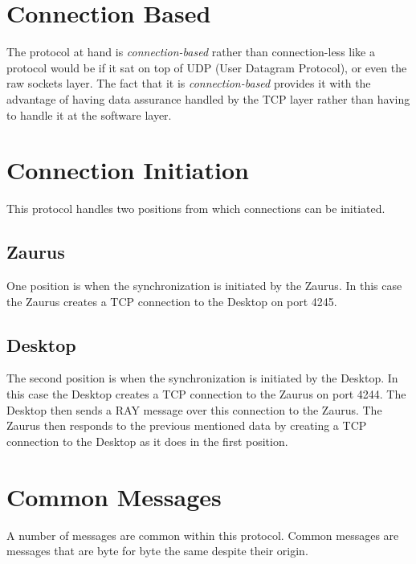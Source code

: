     \section{Connection Based}

    The protocol at hand is \emph{connection-based} rather than connection-less
    like a protocol would be if it sat on top of UDP (User Datagram Protocol),
    or even the raw sockets layer. The fact that it is \emph{connection-based}
    provides it with the advantage of having data assurance handled by
    the TCP layer rather than having to handle it at the software layer.

    \section{Connection Initiation}

    This protocol handles two positions from which connections can be
    initiated.

        \subsection{Zaurus}

        One position is when the synchronization is initiated by the Zaurus.
        In this case the Zaurus creates a TCP connection to the Desktop on
        port 4245.

        \subsection{Desktop}

        The second position is when the synchronization is initiated by the
        Desktop. In this case the Desktop creates a TCP connection to the
        Zaurus on port 4244. The Desktop then sends a RAY message over this
        connection to the Zaurus. The Zaurus then responds to the previous
        mentioned data by creating a TCP connection to the Desktop as it
        does in the first position.

    \section{Common Messages}

    A number of messages are common within this protocol. Common messages
    are messages that are byte for byte the same despite their origin.


